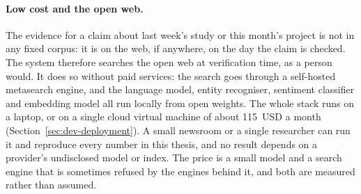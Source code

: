 \paragraph{Low cost and the open web.} The evidence for a claim about
last week's study or this month's project is not in any fixed corpus:
it is on the web, if anywhere, on the day the claim is checked. The
system therefore searches the open web at verification time, as a
person would. It does so without paid services: the search goes
through a self-hosted metasearch engine, and the language model,
entity recogniser, sentiment classifier and embedding model all run
locally from open weights. The whole stack runs on a laptop, or on a
single cloud virtual machine of about 115~USD a month
(Section~\ref{sec:dev-deployment}). A small newsroom or a single
researcher can run it and reproduce every number in this thesis, and
no result depends on a provider's undisclosed model or index. The
price is a small model and a search engine that is sometimes refused
by the engines behind it, and both are measured rather than assumed.
